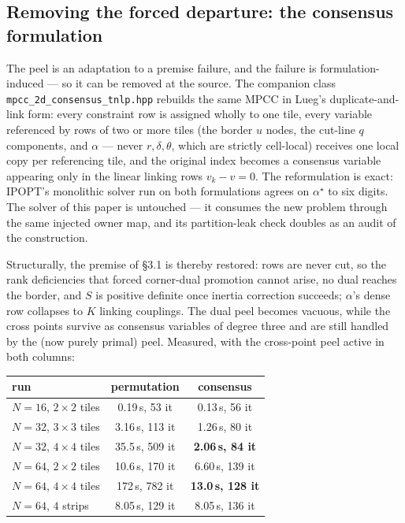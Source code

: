 \documentclass[11pt]{article}
\newcommand{\code}[1]{\texttt{#1}}
\begin{document}
\subsection{Removing the forced departure: the consensus formulation}
\label{sec:consensus}

The peel is an adaptation to a premise failure, and the failure is
formulation-induced --- so it can be removed at the source.  The companion
class \code{mpcc\_2d\_consensus\_tnlp.hpp} rebuilds the same MPCC in Lueg's
duplicate-and-link form: every constraint row is assigned wholly to one tile,
every variable referenced by rows of two or more tiles (the border $u$ nodes,
the cut-line $q$ components, and $\alpha$ --- never $r,\delta,\theta$, which
are strictly cell-local) receives one local copy per referencing tile, and
the original index becomes a consensus variable appearing only in the linear
linking rows $v_k - v = 0$.  The reformulation is exact: IPOPT's monolithic
solver run on both formulations agrees on $\alpha^\star$ to six digits.  The
solver of this paper is untouched --- it consumes the new problem through the
same injected owner map, and its partition-leak check doubles as an audit of
the construction.

Structurally, the premise of \S 3.1 is thereby restored: rows are never cut,
so the rank deficiencies that forced corner-dual promotion cannot arise, no
dual reaches the border, and $S$ is positive definite once inertia correction
succeeds; $\alpha$'s dense row collapses to $K$ linking couplings.  The dual
peel becomes vacuous, while the cross points survive as consensus variables
of degree three and are still handled by the (now purely primal) peel.
Measured, with the cross-point peel active in both columns:

\begin{center}
\begin{tabular}{lcc}
\toprule
run & permutation & consensus\\
\midrule
$N=16$, $2\times2$ tiles & 0.19\,s, 53 it & 0.13\,s, 56 it\\
$N=32$, $3\times3$ tiles & 3.16\,s, 113 it & 1.26\,s, 80 it\\
$N=32$, $4\times4$ tiles & 35.5\,s, 509 it & \textbf{2.06\,s, 84 it}\\
$N=64$, $2\times2$ tiles & 10.6\,s, 170 it & 6.60\,s, 139 it\\
$N=64$, $4\times4$ tiles & 172\,s, 782 it & \textbf{13.0\,s, 128 it}\\
$N=64$, $4$ strips & 8.05\,s, 129 it & 8.05\,s, 136 it\\
\bottomrule
\end{tabular}
\end{center}
\end{document}
